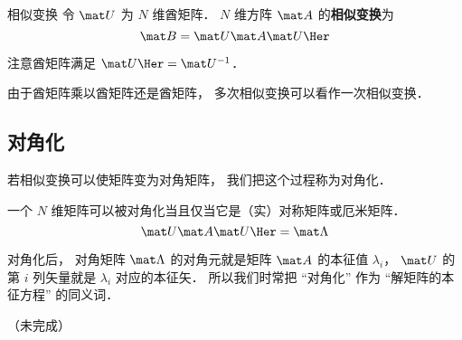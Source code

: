 

\begin{definition}{相似变换}
令 $\mat U$ 为 $N$ 维酋矩阵． $N$ 维方阵 $\mat A$ 的\textbf{相似变换}为
\begin{equation}
\mat B = \mat U \mat A \mat U\Her
\end{equation}
\end{definition}

注意酋矩阵满足 $\mat U\Her = \mat U^{-1}$．

由于酋矩阵乘以酋矩阵还是酋矩阵， 多次相似变换可以看作一次相似变换．

\subsection{对角化}
若相似变换可以使矩阵变为对角矩阵， 我们把这个过程称为对角化．

一个 $N$ 维矩阵可以被对角化当且仅当它是（实）对称矩阵或厄米矩阵．
\begin{equation}
\mat U \mat A \mat U\Her = \mat \Lambda
\end{equation}

对角化后， 对角矩阵 $\mat \Lambda$ 的对角元就是矩阵 $\mat A$ 的本征值 $\lambda_i$， $\mat U$ 的第 $i$ 列矢量就是 $\lambda_i$ 对应的本征矢． 所以我们时常把 “对角化” 作为 “解矩阵的本征方程” 的同义词．

（未完成）
